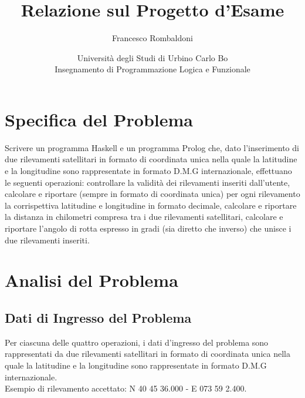 \documentclass{article}
\title{\textbf{Relazione sul Progetto d'Esame}}
\author{Francesco Rombaldoni}
\date{\small Università degli Studi di Urbino Carlo Bo\\
	Insegnamento di Programmazione Logica e Funzionale}
\begin{document}
	\maketitle
	
	
\newpage

\section{Specifica del Problema}
Scrivere un programma Haskell e un programma Prolog che, dato l'inserimento di due rilevamenti satellitari in formato di coordinata unica nella quale la latitudine e la longitudine sono rappresentate in formato D.M.G internazionale, effettuano le seguenti operazioni: controllare la validità dei rilevamenti inseriti dall'utente, calcolare e riportare (sempre in formato di coordinata unica) per ogni rilevamento la corrispettiva latitudine e longitudine in formato decimale, calcolare e riportare la distanza in chilometri compresa tra i due rilevamenti satellitari, calcolare e riportare l'angolo di rotta espresso in gradi (sia diretto che inverso) che unisce i due rilevamenti inseriti.
\newline
\newline
\newpage
			
\section{Analisi del Problema}
\subsection{Dati di Ingresso del Problema}
Per ciascuna delle quattro operazioni, i dati d'ingresso del problema sono rappresentati da due rilevamenti satellitari in formato di coordinata unica nella quale la latitudine e la longitudine sono rappresentate in formato D.M.G internazionale. \\
Esempio di rilevamento accettato: N 40 45 36.000 - E 073 59 2.400.
\end{document}
